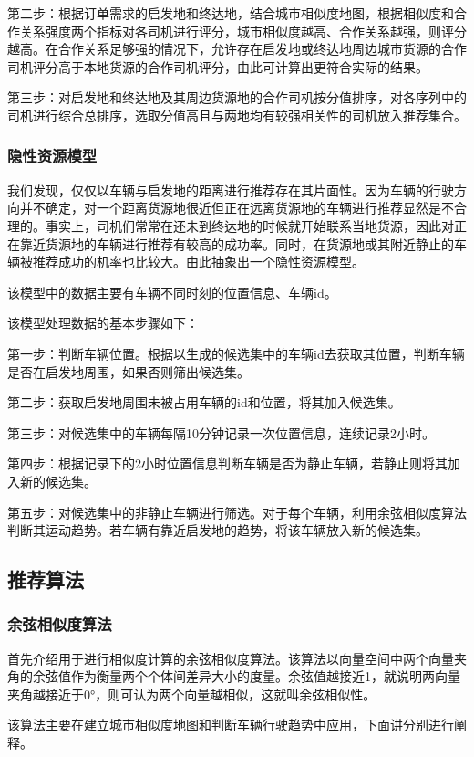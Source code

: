 \documentclass[UTF8]{ctexart}
\begin{document}
\begin{multicols}{2}
第二步：根据订单需求的启发地和终达地，结合城市相似度地图，根据相似度和合作关系强度两个指标对各司机进行评分，城市相似度越高、合作关系越强，则评分越高。在合作关系足够强的情况下，允许存在启发地或终达地周边城市货源的合作司机评分高于本地货源的合作司机评分，由此可计算出更符合实际的结果。

第三步：对启发地和终达地及其周边货源地的合作司机按分值排序，对各序列中的司机进行综合总排序，选取分值高且与两地均有较强相关性的司机放入推荐集合。
\subsubsection{隐性资源模型}

我们发现，仅仅以车辆与启发地的距离进行推荐存在其片面性。因为车辆的行驶方向并不确定，对一个距离货源地很近但正在远离货源地的车辆进行推荐显然是不合理的。事实上，司机们常常在还未到终达地的时候就开始联系当地货源，因此对正在靠近货源地的车辆进行推荐有较高的成功率。同时，在货源地或其附近静止的车辆被推荐成功的机率也比较大。由此抽象出一个隐性资源模型。

该模型中的数据主要有车辆不同时刻的位置信息、车辆id。

该模型处理数据的基本步骤如下：

第一步：判断车辆位置。根据以生成的候选集中的车辆id去获取其位置，判断车辆是否在启发地周围，如果否则筛出候选集。

第二步：获取启发地周围未被占用车辆的id和位置，将其加入候选集。

第三步：对候选集中的车辆每隔10分钟记录一次位置信息，连续记录2小时。

第四步：根据记录下的2小时位置信息判断车辆是否为静止车辆，若静止则将其加入新的候选集。

第五步：对候选集中的非静止车辆进行筛选。对于每个车辆，利用余弦相似度算法判断其运动趋势。若车辆有靠近启发地的趋势，将该车辆放入新的候选集。
\subsection{推荐算法}
\subsubsection{余弦相似度算法}
首先介绍用于进行相似度计算的余弦相似度算法。该算法以向量空间中两个向量夹角的余弦值作为衡量两个个体间差异大小的度量。余弦值越接近1，就说明两向量夹角越接近于0°，则可认为两个向量越相似，这就叫余弦相似性。

该算法主要在建立城市相似度地图和判断车辆行驶趋势中应用，下面讲分别进行阐释。


\end{multicols}
\end{document}
